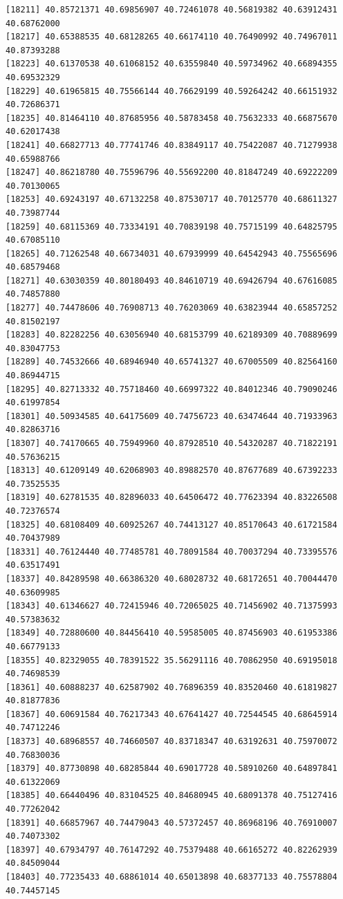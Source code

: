 \documentclass[
  letterpaper,
  DIV=11,
  numbers=noendperiod]{scrartcl}
\begin{document}
\begin{verbatim}
[18211] 40.85721371 40.69856907 40.72461078 40.56819382 40.63912431 40.68762000
[18217] 40.65388535 40.68128265 40.66174110 40.76490992 40.74967011 40.87393288
[18223] 40.61370538 40.61068152 40.63559840 40.59734962 40.66894355 40.69532329
[18229] 40.61965815 40.75566144 40.76629199 40.59264242 40.66151932 40.72686371
[18235] 40.81464110 40.87685956 40.58783458 40.75632333 40.66875670 40.62017438
[18241] 40.66827713 40.77741746 40.83849117 40.75422087 40.71279938 40.65988766
[18247] 40.86218780 40.75596796 40.55692200 40.81847249 40.69222209 40.70130065
[18253] 40.69243197 40.67132258 40.87530717 40.70125770 40.68611327 40.73987744
[18259] 40.68115369 40.73334191 40.70839198 40.75715199 40.64825795 40.67085110
[18265] 40.71262548 40.66734031 40.67939999 40.64542943 40.75565696 40.68579468
[18271] 40.63030359 40.80180493 40.84610719 40.69426794 40.67616085 40.74857880
[18277] 40.74478606 40.76908713 40.76203069 40.63823944 40.65857252 40.81502197
[18283] 40.82282256 40.63056940 40.68153799 40.62189309 40.70889699 40.83047753
[18289] 40.74532666 40.68946940 40.65741327 40.67005509 40.82564160 40.86944715
[18295] 40.82713332 40.75718460 40.66997322 40.84012346 40.79090246 40.61997854
[18301] 40.50934585 40.64175609 40.74756723 40.63474644 40.71933963 40.82863716
[18307] 40.74170665 40.75949960 40.87928510 40.54320287 40.71822191 40.57636215
[18313] 40.61209149 40.62068903 40.89882570 40.87677689 40.67392233 40.73525535
[18319] 40.62781535 40.82896033 40.64506472 40.77623394 40.83226508 40.72376574
[18325] 40.68108409 40.60925267 40.74413127 40.85170643 40.61721584 40.70437989
[18331] 40.76124440 40.77485781 40.78091584 40.70037294 40.73395576 40.63517491
[18337] 40.84289598 40.66386320 40.68028732 40.68172651 40.70044470 40.63609985
[18343] 40.61346627 40.72415946 40.72065025 40.71456902 40.71375993 40.57383632
[18349] 40.72880600 40.84456410 40.59585005 40.87456903 40.61953386 40.66779133
[18355] 40.82329055 40.78391522 35.56291116 40.70862950 40.69195018 40.74698539
[18361] 40.60888237 40.62587902 40.76896359 40.83520460 40.61819827 40.81877836
[18367] 40.60691584 40.76217343 40.67641427 40.72544545 40.68645914 40.74712246
[18373] 40.68968557 40.74660507 40.83718347 40.63192631 40.75970072 40.76830036
[18379] 40.87730898 40.68285844 40.69017728 40.58910260 40.64897841 40.61322069
[18385] 40.66440496 40.83104525 40.84680945 40.68091378 40.75127416 40.77262042
[18391] 40.66857967 40.74479043 40.57372457 40.86968196 40.76910007 40.74073302
[18397] 40.67934797 40.76147292 40.75379488 40.66165272 40.82262939 40.84509044
[18403] 40.77235433 40.68861014 40.65013898 40.68377133 40.75578804 40.74457145

\end{verbatim}
\end{document}
